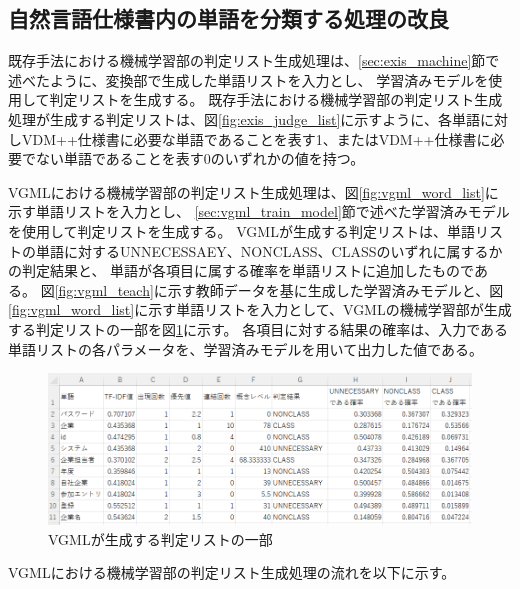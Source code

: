 \subsection{自然言語仕様書内の単語を分類する処理の改良}
既存手法における機械学習部の判定リスト生成処理は、\ref{sec:exis_machine}節で述べたように、変換部で生成した単語リストを入力とし、
学習済みモデルを使用して判定リストを生成する。
既存手法における機械学習部の判定リスト生成処理が生成する判定リストは、図\ref{fig:exis_judge_list}に示すように、各単語に対しVDM++仕様書に必要な単語であることを表す1、またはVDM++仕様書に必要でない単語であることを表す0のいずれかの値を持つ。

VGMLにおける機械学習部の判定リスト生成処理は、図\ref{fig:vgml_word_list}に示す単語リストを入力とし、
\ref{sec:vgml_train_model}節で述べた学習済みモデルを使用して判定リストを生成する。
VGMLが生成する判定リストは、単語リストの単語に対するUNNECESSAEY、NONCLASS、CLASSのいずれに属するかの判定結果と、
単語が各項目に属する確率を単語リストに追加したものである。
図\ref{fig:vgml_teach}に示す教師データを基に生成した学習済みモデルと、図\ref{fig:vgml_word_list}に示す単語リストを入力として、VGMLの機械学習部が生成する判定リストの一部を図\ref{fig:vgml_judge_list}に示す。
各項目に対する結果の確率は、入力である単語リストの各パラメータを、学習済みモデルを用いて出力した値である。

\begin{figure}[t]
    \begin{center}
        \includegraphics[width=1.0\columnwidth]{image/vgml_judge_list.png}
        \caption{VGMLが生成する判定リストの一部}
        \label{fig:vgml_judge_list}
    \end{center}
\end{figure}

VGMLにおける機械学習部の判定リスト生成処理の流れを以下に示す。

